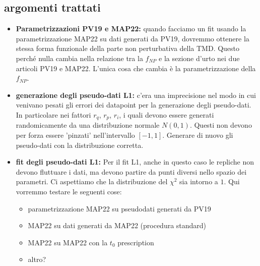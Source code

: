 \documentclass{article}
\begin{document}
\subsection{argomenti trattati}
\begin{itemize}
    \item \textbf{Parametrizzazioni PV19 e MAP22: } quando facciamo un fit usando la parametrizzazione MAP22 su dati generati da PV19, dovremmo ottenere la stessa forma funzionale della parte non perturbativa della TMD. Questo perché nulla cambia nella relazione tra la $f_{NP}$ e la sezione d'urto nei due articoli PV19 e MAP22. L'unica cosa che cambia è la parametrizzazione della $f_{NP}$.
    \item \textbf{generazione degli pseudo-dati L1: } c'era una imprecisione nel modo in cui venivano pesati gli errori dei datapoint per la generazione degli pseudo-dati. In particolare nei fattori $r_q$, $r_p$, $r_i$, i quali devono essere generati randomicamente da una distribuzione normale $N(0, 1)$. Questi non devono per forza essere 'pinzati' nell'intervallo $[-1, 1]$. Generare di nuovo gli pseudo-dati con la distribuzione corretta.
    \item \textbf{fit degli pseudo-dati L1: } Per il fit L1, anche in questo caso le repliche non devono fluttuare i dati, ma devono partire da punti diversi nello spazio dei parametri. Ci aspettiamo che la distribuzione del $\chi ^2$ sia intorno a $1$. Qui vorremmo testare le seguenti cose:
    \begin{itemize}
        \item parametrizzazione MAP22 su pseudodati generati da PV19
        \item MAP22 su dati generati da MAP22 (procedura standard)
        \item MAP22 su MAP22 con la $t_0$ prescription
        \item altro?
    \end{itemize}
    
    \end{itemize}
\end{document}

